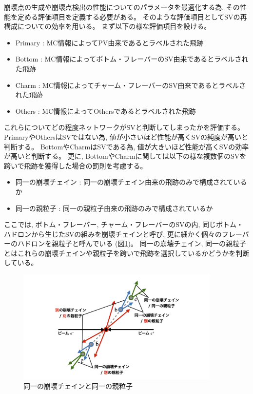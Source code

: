 崩壊点の生成や崩壊点検出の性能についてのパラメータを最適化する為, その性能を定める評価項目を定義する必要がある。
そのような評価項目としてSVの再構成についての効率を用いる。
まず以下の様な評価項目を設ける。

\begin{itemize}
 \item Primary : MC情報によってPV由来であるとラベルされた飛跡
 \item Bottom : MC情報によってボトム・フレーバーのSV由来であるとラベルされた飛跡
 \item Charm : MC情報によってチャーム・フレーバーのSV由来であるとラベルされた飛跡
  \item Others : MC情報によってOthersであるとラベルされた飛跡
\end{itemize}

これらについてどの程度ネットワークがSVと判断してしまったかを評価する。
PrimaryやOthersはSVではない為, 値が小さいほど性能が高くSVの純度が高いと判断する。
BottomやCharmはSVである為, 値が大きいほど性能が高くSVの効率が高いと判断する。
更に, BottomやCharmに関しては以下の様な複数個のSVを跨いで飛跡を獲得した場合の罰則を考慮する。

\begin{itemize}
 \item 同一の崩壊チェイン : 同一の崩壊チェイン由来の飛跡のみで構成されているか
 \item 同一の親粒子 : 同一の親粒子由来の飛跡のみで構成されているか
\end{itemize}

ここでは, ボトム・フレーバー, チャーム・フレーバーのSVの内, 同じボトム・ハドロンから生じたSVの組みを崩壊チェインと呼び, 更に細かく個々のフレーバーのハドロンを親粒子と呼んでいる (図\ref{4-2-2-1SameChainSameParticle})。
同一の崩壊チェイン, 同一の親粒子とはこれらの崩壊チェインや親粒子を跨いで飛跡を選択しているかどうかを判断している。

\begin{figure}[htbp]
 \centering
 \includegraphics[width=0.9\textwidth, clip]{Figure/4VertexFinderwithDL/4-2-2-1SameChainSameParticle.png}
 \caption[同一の崩壊チェインと同一の親粒子]{同一の崩壊チェインと同一の親粒子}
 \label{4-2-2-1SameChainSameParticle}
\end{figure}

